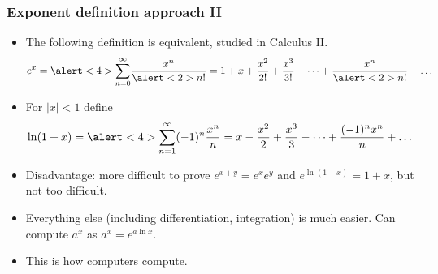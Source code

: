 \begin{frame}
\frametitle{Exponent definition approach II }
\begin{itemize}
\item<1-> The following definition is equivalent, studied in Calculus II.
\[
e^{x}=\alert<4>{\sum_{n=0}^{\infty}} \frac{x^n}{\alert<2>{n!}}= 1+ x+\frac{x^2}{2!}+\frac{x^3}{3!}+\dots + \frac{x^{n}}{\alert<2>{n!}}+\dots
\]
\item<3-> For $|x|<1$ define 
\[
\ln (1+x)=\alert<4>{\sum_{n=1}^{\infty}} (-1)^n\frac{x^n}{n}=  x-\frac{x^2}{2}+\frac{x^3}{3}-\dots + \frac{(-1)^nx^{n}}{n}+\dots
\]
\item<5-> Disadvantage: more difficult to prove $e^{x+y}=e^{x}e^y$ and $e^{\ln(1+x)}=1+x$, but not too difficult.
\item<6-> Everything else (including differentiation, integration) is much easier. Can compute $a^x$ as $a^x=e^{a\ln x}$. 
\item<7-> This is how computers compute.
\end{itemize}
\end{frame}

